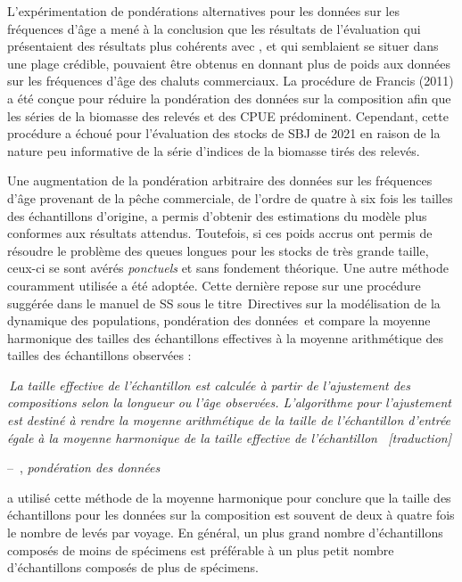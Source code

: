 \documentclass[11pt]{book}
\makeatletter
\newcommand{\angL}{\guillemotleft\,}
\newcommand{\angR}{\,\guillemotright}
\newenvironment{chapquote}[2][2em]
  {\setlength{\@tempdima}{#1}%
   \def\chapquote@author{#2}%
   \parshape 1 \@tempdima \dimexpr\textwidth-2\@tempdima\relax%
   \itshape}
  {\par\normalfont\hfill--\ \chapquote@author\hspace*{\@tempdima}\par\smallskip}
\makeatother
\begin{document}
L'exp\'{e}rimentation de pond\'{e}rations alternatives pour les donn\'{e}es sur les fr\'{e}quences d'\^{a}ge a men\'{e} \`{a} la conclusion que les r\'{e}sultats de l'\'{e}valuation qui pr\'{e}sentaient des r\'{e}sultats plus coh\'{e}rents avec \citet{Edwards-etal:2012_ymr}, et qui semblaient se situer dans une plage cr\'{e}dible, pouvaient \^{e}tre obtenus en donnant plus de poids aux donn\'{e}es sur les fr\'{e}quences d'\^{a}ge des chaluts commerciaux.
La proc\'{e}dure de Francis (2011) a \'{e}t\'{e} con\c{c}ue pour r\'{e}duire la pond\'{e}ration des donn\'{e}es sur la composition afin que les s\'{e}ries de la biomasse des relev\'{e}s et des CPUE pr\'{e}dominent.
Cependant, cette proc\'{e}dure a \'{e}chou\'{e} pour l'\'{e}valuation des stocks de SBJ de 2021 en raison de la nature peu informative de la s\'{e}rie d'indices de la biomasse tir\'{e}s des relev\'{e}s.

Une augmentation de la pond\'{e}ration arbitraire des donn\'{e}es sur les fr\'{e}quences d'\^{a}ge provenant de la p\^{e}che commerciale, de l'ordre de quatre \`{a} six fois les tailles des \'{e}chantillons d'origine, a permis d'obtenir des estimations du mod\`{e}le plus conformes aux r\'{e}sultats attendus.
Toutefois, si ces poids accrus ont permis de r\'{e}soudre le probl\`{e}me des queues longues pour les stocks de tr\`{e}s grande taille, ceux-ci se sont av\'{e}r\'{e}s \emph{ponctuels} et sans fondement th\'{e}orique.
Une autre m\'{e}thode couramment utilis\'{e}e a \'{e}t\'{e} adopt\'{e}e. Cette derni\`{e}re repose sur une proc\'{e}dure sugg\'{e}r\'{e}e dans le manuel de SS sous le titre \angL Directives sur la mod\'{e}lisation de la dynamique des populations, pond\'{e}ration des donn\'{e}es\angR{} et compare la moyenne harmonique des tailles des \'{e}chantillons effectives \`{a} la moyenne arithm\'{e}tique des tailles des \'{e}chantillons observ\'{e}es :

\begin{chapquote}{\citet{Methot-etal:2021}, \textit{pond\'{e}ration des donn\'{e}es}}
\angL La taille effective de l'\'{e}chantillon est calcul\'{e}e \`{a} partir de l'ajustement des compositions selon la longueur ou l'\^{a}ge observ\'{e}es. L'algorithme pour l'ajustement est destin\'{e} \`{a} rendre la moyenne arithm\'{e}tique de la taille de l'\'{e}chantillon d'entr\'{e}e \'{e}gale \`{a} la moyenne harmonique de la taille effective de l'\'{e}chantillon \citep{McAllister-Ianelli:1997}\angR{} [traduction]
\end{chapquote}

\citet{Stewart-Hamel:2014} a utilis\'{e} cette m\'{e}thode de la moyenne harmonique pour conclure que la taille des \'{e}chantillons pour les donn\'{e}es sur la composition est souvent de deux \`{a} quatre fois le nombre de lev\'{e}s par voyage.
En g\'{e}n\'{e}ral, un plus grand nombre d'\'{e}chantillons compos\'{e}s de moins de sp\'{e}cimens est pr\'{e}f\'{e}rable \`{a} un plus petit nombre d'\'{e}chantillons compos\'{e}s de plus de sp\'{e}cimens.
\end{document}
